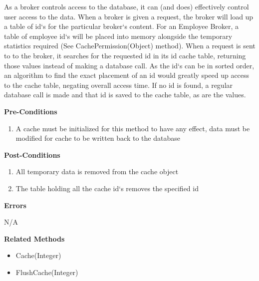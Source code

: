 \documentclass[letterpaper,12pt]{report}
\begin{document}
{\begin{description}
	\par \noindent \hspace*{1cm} As a broker controls access to the database, it can (and does) effectively control user access to the data. When a broker is given a request, the broker will load up a table of id`s for the particular broker`s content. For an Employee Broker, a table of employee id`s will be placed into memory alongside the temporary statistics required (See CachePermission(Object) method). When a request is sent to to the broker, it searches for the requested id in its id cache table, returning those values instead of making a database call. As the id`s can be in sorted order, an algorithm to find the exact placement of an id would greatly speed up access to the cache table, negating overall access time. If no id is found, a regular database call is made and that id is saved to the cache table, as are the values. 
      \item \textbf{Pre-Conditions}
      \begin{enumerate}
       \item A cache must be initialized for this method to have any effect, data must be modified for cache to be written back to the database
      \end{enumerate}
      \item \textbf{Post-Conditions}
      \begin{enumerate}
       \item All temporary data is removed from the cache object
       \item The table holding all the cache id`s removes the specified id
      \end{enumerate}
      \item[] \textbf{Errors}
	\par \noindent \hspace*{1cm} N/A
      \item \textbf{Related Methods} 
      \begin{itemize}
       \item Cache(Integer)
       \item FlushCache(Integer)
      \end{itemize}
    \end{description}
}
\end{document}
